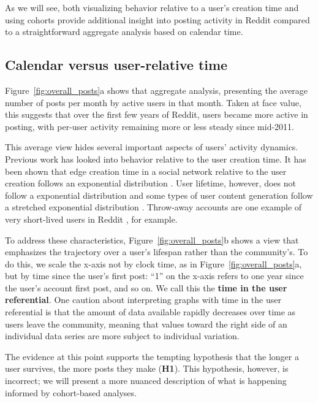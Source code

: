 \documentclass[10pt, oneside, onecolumn]{article}
\begin{document}
As we will see, both visualizing behavior relative to a user's creation time and using cohorts provide additional insight into posting activity in Reddit compared to a straightforward aggregate analysis based on calendar time.

\subsection{Calendar versus user-relative time}

Figure~\ref{fig:overall_posts}a shows that aggregate analysis, presenting the average number of posts per month by active users in that month.  Taken at face value, this 
suggests that over the first few years of Reddit, users became more active in posting, with per-user activity remaining more or less steady since mid-2011.


This average view hides several important aspects of users' activity dynamics. Previous work has looked into behavior relative to the user creation time. It has been shown that edge creation time in a social network relative to the user creation follows an exponential distribution \cite{Tomkins2008}. User lifetime, however, does not follow a exponential distribution and some types of user content generation follow a stretched exponential distribution \cite{Guo2009}. Throw-away accounts are one example of very short-lived users in Reddit \cite{Bergstrom2011}, for example. 

To address these characteristics, Figure~\ref{fig:overall_posts}b shows a view that emphasizes the trajectory over a user's lifespan rather than the community's.  To do this, we scale the x-axis not by clock time, as in Figure~\ref{fig:overall_posts}a, but by time since the user's first post: ``1'' on the x-axis refers to one year since the user's account first post, and so on. We call this the \textbf{time in the user referential}. One caution about interpreting graphs with time in the user referential is that the amount of data available rapidly decreases over time as users leave the community, meaning that values toward the right side of an individual data series are more subject to individual variation.  

The evidence at this point supports the tempting hypothesis that the longer a user survives, the more posts they make (\textbf{H1}).  This hypothesis, however, is incorrect; we will present a more nuanced description of what is happening informed by cohort-based analyses.
\end{document}
